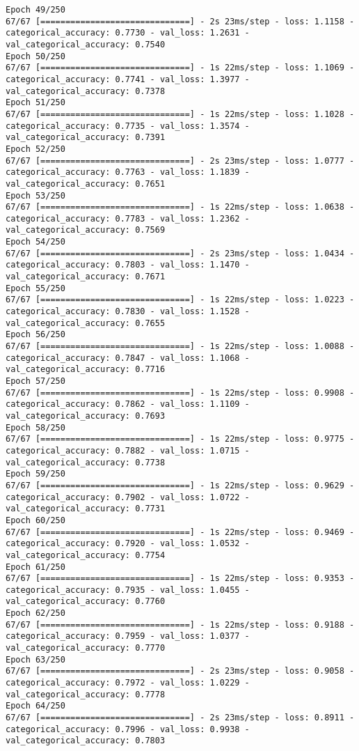 \begin{lstlisting}
Epoch 49/250
67/67 [==============================] - 2s 23ms/step - loss: 1.1158 - categorical_accuracy: 0.7730 - val_loss: 1.2631 - val_categorical_accuracy: 0.7540
Epoch 50/250
67/67 [==============================] - 1s 22ms/step - loss: 1.1069 - categorical_accuracy: 0.7741 - val_loss: 1.3977 - val_categorical_accuracy: 0.7378
Epoch 51/250
67/67 [==============================] - 1s 22ms/step - loss: 1.1028 - categorical_accuracy: 0.7735 - val_loss: 1.3574 - val_categorical_accuracy: 0.7391
Epoch 52/250
67/67 [==============================] - 2s 23ms/step - loss: 1.0777 - categorical_accuracy: 0.7763 - val_loss: 1.1839 - val_categorical_accuracy: 0.7651
Epoch 53/250
67/67 [==============================] - 1s 22ms/step - loss: 1.0638 - categorical_accuracy: 0.7783 - val_loss: 1.2362 - val_categorical_accuracy: 0.7569
Epoch 54/250
67/67 [==============================] - 2s 23ms/step - loss: 1.0434 - categorical_accuracy: 0.7803 - val_loss: 1.1470 - val_categorical_accuracy: 0.7671
Epoch 55/250
67/67 [==============================] - 1s 22ms/step - loss: 1.0223 - categorical_accuracy: 0.7830 - val_loss: 1.1528 - val_categorical_accuracy: 0.7655
Epoch 56/250
67/67 [==============================] - 1s 22ms/step - loss: 1.0088 - categorical_accuracy: 0.7847 - val_loss: 1.1068 - val_categorical_accuracy: 0.7716
Epoch 57/250
67/67 [==============================] - 1s 22ms/step - loss: 0.9908 - categorical_accuracy: 0.7862 - val_loss: 1.1109 - val_categorical_accuracy: 0.7693
Epoch 58/250
67/67 [==============================] - 1s 22ms/step - loss: 0.9775 - categorical_accuracy: 0.7882 - val_loss: 1.0715 - val_categorical_accuracy: 0.7738
Epoch 59/250
67/67 [==============================] - 1s 22ms/step - loss: 0.9629 - categorical_accuracy: 0.7902 - val_loss: 1.0722 - val_categorical_accuracy: 0.7731
Epoch 60/250
67/67 [==============================] - 1s 22ms/step - loss: 0.9469 - categorical_accuracy: 0.7920 - val_loss: 1.0532 - val_categorical_accuracy: 0.7754
Epoch 61/250
67/67 [==============================] - 1s 22ms/step - loss: 0.9353 - categorical_accuracy: 0.7935 - val_loss: 1.0455 - val_categorical_accuracy: 0.7760
Epoch 62/250
67/67 [==============================] - 1s 22ms/step - loss: 0.9188 - categorical_accuracy: 0.7959 - val_loss: 1.0377 - val_categorical_accuracy: 0.7770
Epoch 63/250
67/67 [==============================] - 2s 23ms/step - loss: 0.9058 - categorical_accuracy: 0.7972 - val_loss: 1.0229 - val_categorical_accuracy: 0.7778
Epoch 64/250
67/67 [==============================] - 2s 23ms/step - loss: 0.8911 - categorical_accuracy: 0.7996 - val_loss: 0.9938 - val_categorical_accuracy: 0.7803

\end{lstlisting}
